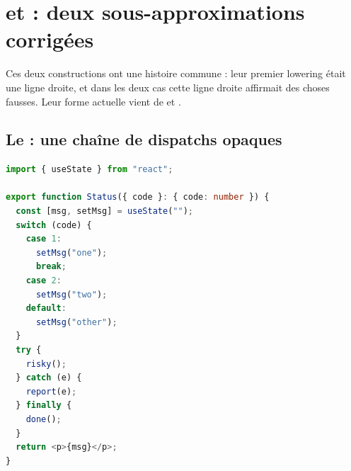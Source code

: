 \section{ et  : deux sous-approximations corrigées}
\label{sec:lowering-switch-try}

Ces deux constructions ont une histoire commune : leur premier lowering était une ligne droite, et dans les deux cas cette ligne droite affirmait des choses fausses. Leur forme actuelle vient de  et .

\subsection{Le  : une chaîne de dispatchs opaques}

\begin{lstlisting}[language=TypeScript,caption={\code{switch} avec fall-through, puis \code{try/catch/finally} (\file{/tmp/ch07/e4_switch_try.tsx})},label={lst:lowering-status}]
import { useState } from "react";

export function Status({ code }: { code: number }) {
  const [msg, setMsg] = useState("");
  switch (code) {
    case 1:
      setMsg("one");
      break;
    case 2:
      setMsg("two");
    default:
      setMsg("other");
  }
  try {
    risky();
  } catch (e) {
    report(e);
  } finally {
    done();
  }
  return <p>{msg}</p>;
}
\end{lstlisting}



